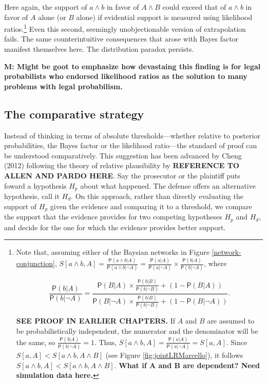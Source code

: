 \documentclass[10pt,dvipsnames,enabledeprecatedfontcommands]{scrartcl}
\newcommand{\pr}[1]{\mathsf{P}(#1)}
\begin{document}
\noindent Here again, the support of \(a\wedge b\) in favor of
\(A\wedge B\) could exceed that of \(a\wedge b\) in favor of \(A\) alone
(or \(B\) alone) if evidential support is measured using likelihood
ratios.\footnote{Note that, assuming either of the Baysian networks 
in Figure \ref{network-conjunction},  $S[a\wedge b, A]=\frac{\pr{a \wedge b \vert A}}{\pr{a\wedge b\vert \neg A}}=\frac{\pr{a \vert A}}{\pr{a \vert \neg A}}\times \frac{\pr{b \vert A}}{\pr{b \vert \neg A}}$, where

\[\frac{\pr{b \vert A}}{\pr{b \vert \neg A}} = \frac{\pr{B \vert A} \times \frac{\pr{b \vert B}}{\pr{b \vert \neg B}} + (1- \pr{B \vert A})}{\pr{B \vert \neg A} \times \frac{\pr{b \vert B}}{\pr{b \vert \neg B}} + (1- \pr{B \vert \neg A})}.\]

\textbf{SEE PROOF IN EARLIER CHAPTERS.}
 If $A$ and $B$ are assumed to be probabilistically independent, the numerator and the denominator will be the same, 
 so $\frac{\pr{b \vert A}}{\pr{b \vert \neg A}}=1$. Thus, 
 $S[a\wedge b, A]=\frac{\pr{a \vert A}}{\pr{a \vert \neg A}}=S[a, A]$. Since $S[a, A]< S[a\wedge b, A\wedge B]$ (see Figure \ref{fig:jointLRMarcello}), it follows $S[a\wedge b, A]<S[a\wedge b, A\wedge B]$. \textbf{What if A and B are dependent? Need simulation data here.}}
Even this second, seemingly unobjectionable version of extrapolation
fails. The same counterintuitive consequences that arose with Bayes
factor manifest themselves here. The distribution paradox persists.


\textbf{M: Might be goot to emphasize how devastaing this finding is for legal probabilists 
who endorsed likelihood ratios as the solution to many problems with legal probabilism.}

\hypertarget{the-comparative-strategy}{%
\subsection{The comparative strategy}\label{the-comparative-strategy}}

Instead of thinking in terms of absolute thresholds---whether relative
to posterior probabilities, the Bayes factor or the likelihood
ratio---the standard of proof can be understood comparatively. This
suggestion has been advanced by Cheng (2012) following the theory of
relative plausibility by \textbf{REFERENCE TO ALLEN AND PARDO HERE}. Say
the prosecutor or the plaintiff puts foward a hypothesis \(H_p\) about
what happened. The defense offers an alternative hypothesis, call it
\(H_d\). On this approach, rather than directly evaluating the support
of \(H_p\) given the evidence and comparing it to a threshold, we
compare the support that the evidence provides for two competing
hypotheses \(H_p\) and \(H_d\), and decide for the one for which the
evidence provides better support.
\end{document}
